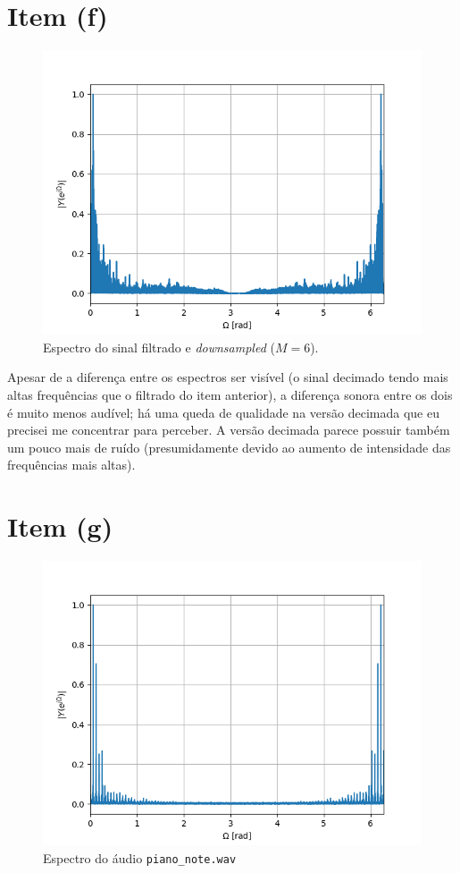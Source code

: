 \documentclass{article}
\begin{document}
\section*{Item (f)}
\FloatBarrier
\begin{figure}[!ht]
    \centering
    \includegraphics[width=\linewidth]{images/filtered_downsampled_spectrum.png}
    \caption{Espectro do sinal filtrado e \textit{downsampled} ($M=6$).}
\end{figure}

Apesar de a diferença entre os espectros ser visível (o sinal decimado tendo mais altas frequências que o filtrado do item anterior), a diferença sonora entre os dois é muito menos audível; há uma queda de qualidade na versão decimada que eu precisei me concentrar para perceber. A versão decimada parece possuir também um pouco mais de ruído (presumidamente devido ao aumento de intensidade das frequências mais altas).

\newpage
\section*{Item (g)}
\FloatBarrier
\begin{figure}[!ht]
    \centering
    \includegraphics[width=\linewidth]{images/piano_note_spectrum.png}
    \caption{Espectro do áudio \texttt{piano\_note.wav}}
\end{figure}
\end{document}
